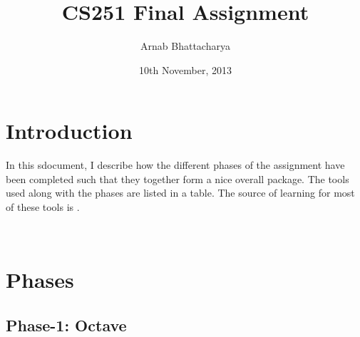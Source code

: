 \documentclass[]{article}
\title{CS251 Final Assignment}
\author{Arnab Bhattacharya}
\date{10th November, 2013}
\begin{document}
\maketitle

\section{Introduction}

In this sdocument, I describe how the different phases of the assignment have
been completed such that they together form a nice overall package.  The tools
used along with the phases are listed in a table.  The source of
learning for most of these tools is \cite{cs251}.

\\

\section{Phases}

\subsection{Phase-1: Octave}
\end{document}
